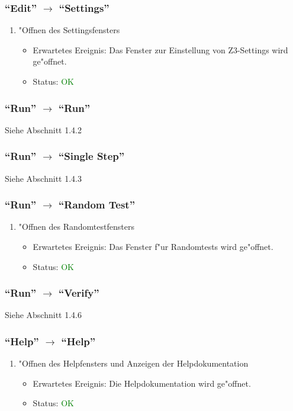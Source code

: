 \subsubsection{"`Edit"' $\rightarrow$ "`Settings"'}
\begin{enumerate}
\item "Offnen des Settingsfensters
\begin{itemize}
\item Erwartetes Ereignis: Das Fenster zur Einstellung von Z3-Settings wird ge"offnet. 
\item Status: \textcolor{green}{OK}
\end{itemize}
\end{enumerate}
\subsubsection{"`Run"' $\rightarrow$ "`Run"'}
Siehe Abschnitt 1.4.2
\subsubsection{"`Run"' $\rightarrow$ "`Single Step"'}
Siehe Abschnitt 1.4.3
\subsubsection{"`Run"' $\rightarrow$ "`Random Test"'}
\begin{enumerate}
\item "Offnen des Randomtestfensters
\begin{itemize}
\item Erwartetes Ereignis: Das Fenster f"ur Randomtests wird ge"offnet. 
\item Status: \textcolor{green}{OK}
\end{itemize}
\end{enumerate}
\subsubsection{"`Run"' $\rightarrow$ "`Verify"'}
Siehe Abschnitt 1.4.6
\subsubsection{"`Help"' $\rightarrow$ "`Help"'}
\begin{enumerate}
\item "Offnen des Helpfensters und Anzeigen der Helpdokumentation
\begin{itemize}
\item Erwartetes Ereignis: Die Helpdokumentation wird ge"offnet. 
\item Status: \textcolor{green}{OK}
\end{itemize}
\end{enumerate}
